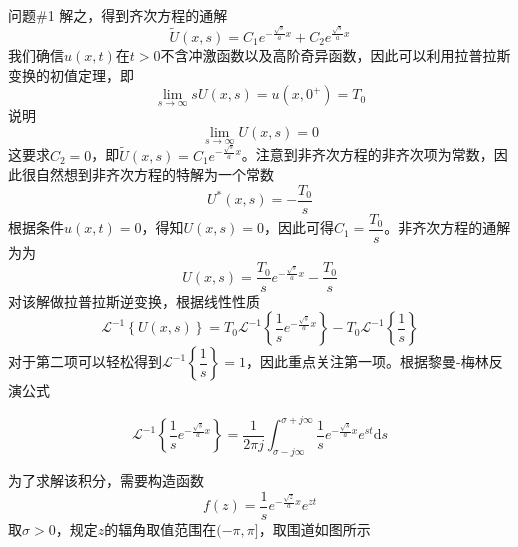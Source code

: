 \documentclass[12pt]{ctexart}
\begin{document}
    \begin{problem}{问题\#1}
        解之，得到齐次方程的通解
        $$
        \widetilde{U}(x,s)=C_1e^{-\frac{\sqrt{s}}{a}x}+C_2e^{\frac{\sqrt{s}}{a}x}
        $$
        我们确信$u(x,t)$在$t>0$不含冲激函数以及高阶奇异函数，因此可以利用拉普拉斯变换的初值定理，即
        $$
        \lim_{s\to \infty}sU(x,s)=u(x,0^+)=T_0
        $$
        说明
        $$
        \lim_{s\to \infty}U(x,s)=0
        $$
        这要求$C_2=0$，即$\widetilde{U}(x,s)=C_1e^{-\frac{\sqrt{s}}{a}x}$。注意到非齐次方程的非齐次项为常数，因此很自然想到非齐次方程的特解为一个常数
        $$
        U^\ast (x,s)=-\dfrac{T_0}{s}
        $$
        根据条件$u(x,t)=0$，得知$U(x,s)=0$，因此可得$C_1=\dfrac{T_0}{s}$。非齐次方程的通解为为
        $$
        U(x,s)=\dfrac{T_0}{s}e^{-\frac{\sqrt{s}}{a}x}-\dfrac{T_0}{s}
        $$
        对该解做拉普拉斯逆变换，根据线性性质
        $$
        \mathscr{L}^{-1}\left\{U(x,s)\right\}=T_0\mathscr{L}^{-1}\left\{\dfrac{1}{s}e^{-\frac{\sqrt{s}}{a}x}\right\}-T_0\mathscr{L}^{-1}\left\{\dfrac{1}{s}\right\}
        $$
        对于第二项可以轻松得到$\mathscr{L}^{-1}\left\{\dfrac{1}{s}\right\}=1$，因此重点关注第一项。根据黎曼-梅林反演公式
        \begin{formal}
            $$
            \mathscr{L}^{-1}\left\{\dfrac{1}{s}e^{-\frac{\sqrt{s}}{a}x}\right\}=\dfrac{1}{2\pi j}\int^{\sigma+j\infty}_{\sigma-j\infty}\dfrac{1}{s}e^{-\frac{\sqrt{s}}{a}x}e^{st}\mathrm{d}s
            $$
        \end{formal}
        为了求解该积分，需要构造函数
        $$
        f(z)=\dfrac{1}{s}e^{-\frac{\sqrt{z}}{a}x}e^{zt}
        $$
        取$\sigma>0$，规定$z$的辐角取值范围在$(-\pi,\pi]$，取围道如图所示
    \end{problem}
\end{document}
